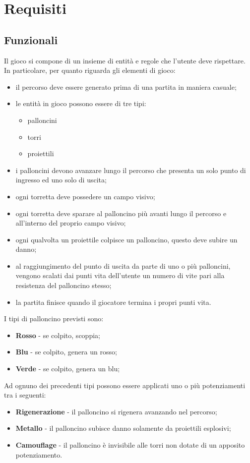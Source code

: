 \section{Requisiti}

\subsection{Funzionali}
Il gioco si compone di un insieme di entità e regole che l'utente deve rispettare. In particolare, per quanto riguarda gli elementi di gioco:
\begin{itemize}
    \item il percorso deve essere generato prima di una partita in maniera casuale;
    \item le entità in gioco possono essere di tre tipi:
    \begin{itemize}
        \item palloncini
        \item torri
        \item proiettili
    \end{itemize}
    \item i palloncini devono avanzare lungo il percorso che presenta un solo punto di ingresso ed uno solo di uscita;
    \item ogni torretta deve possedere un campo visivo;
    \item ogni torretta deve sparare al palloncino più avanti lungo il percorso e all'interno del proprio campo visivo;
    \item ogni qualvolta un proiettile colpisce un palloncino, questo deve subire un danno;
    \item al raggiungimento del punto di uscita da parte di uno o più palloncini, vengono scalati dai punti vita dell'utente un numero di vite pari alla resistenza del palloncino stesso;
    \item la partita finisce quando il giocatore termina i propri punti vita.
\end{itemize}
I tipi di palloncino previsti sono:
\begin{itemize}
    \item \textbf{Rosso} - se colpito, scoppia;
    \item \textbf{Blu} - se colpito, genera un rosso;
    \item \textbf{Verde} - se colpito, genera un blu;
\end{itemize}
Ad ognuno dei precedenti tipi possono essere applicati uno o più potenziamenti tra i seguenti:
\begin{itemize}
    \item \textbf{Rigenerazione} - il palloncino si rigenera avanzando nel percorso;
    \item \textbf{Metallo} - il palloncino subisce danno solamente da proiettili esplosivi;
    \item \textbf{Camouflage} - il palloncino è invisibile alle torri non dotate di un apposito potenziamento.
\end{itemize}
